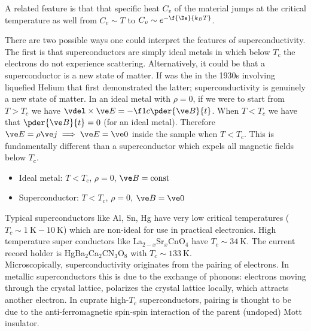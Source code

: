 \documentclass{article}
\begin{document}
A related feature is that that specific heat $C_v$ of the material jumps at the critical temperature as well from $C_v \sim T$ to $C_v \sim e^{-\f{\De}{k_B T}}$. \\
\begin{center}
\end{center}

There are two possible ways one could interpret the features of superconductivity. The first is that superconductors are simply ideal metals in which below $T_c$ the electrons do not experience scattering. Alternatively, it could be that a superconductor is a new state of matter. If was the  in the 1930s involving liquefied Helium that first demonstrated the latter; superconductivity is genuinely a new state of matter. In an ideal metal with $\rho = 0$, if we were to start from $T > T_c$ we have $\vdel \times \ve E = - \f1c \pder{\ve B}{t}$. When $T < T_c$ we have that $\pder{\ve B}{t} = 0$ (for an ideal metal). Therefore $\ve E = \rho \ve j \implies \ve E = \ve 0$ inside the sample when $T < T_c$. This is fundamentally different than a superconductor which expels all magnetic fields below $T_c$.
\begin{itemize}
    \item Ideal metal: $T < T_c$, $\rho = 0$, $\ve B = \text{const}$
    \item Superconductor: $T < T_c$, $\rho = 0$, $\ve B = \ve 0$
\end{itemize}
Typical superconductors like Al, Sn, Hg have very low critical temperatures ($T_c \sim \SI{1}{\K} - \SI{10}{\K}$) which are non-ideal for use in practical electronics. High temperature super conductors like La$_{2-x}$Sr$_{x}$CnO$_4$ have $T_c \sim \SI{34}{\K}$. The current record holder is HgBa$_2$Ca$_2$CN$_3$O$_8$ with $T_c \sim \SI{133}{\K}$. \\

Microscopically, superconductivity originates from the pairing of electrons. In metallic superconductors this is due to the exchange of phonons: electrons moving through the crystal lattice, polarizes the crystal lattice locally, which attracts another electron. In cuprate high-$T_c$ superconductors, pairing is thought to be due to the anti-ferromagnetic spin-spin interaction of the parent (undoped) Mott insulator. \\
\end{document}
